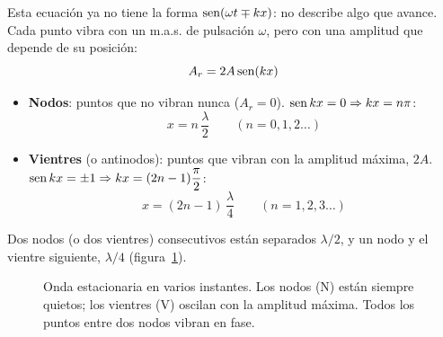Esta ecuación ya no tiene la forma \(\operatorname{sen}(\omega t \mp kx)\): no describe algo que avance. Cada punto vibra con un m.a.s. de
pulsación \(\omega\), pero con una amplitud que depende de su posición:
\begin{equation*}
    A_r = 2A\operatorname{sen}(kx)
\end{equation*}

\begin{itemize}
    \item \textbf{Nodos}: puntos que no vibran nunca (\(A_r = 0\)). \(\operatorname{sen} kx = 0 \Rightarrow kx = n\pi\):
    \[ \boxed{x = n\,\dfrac{\lambda}{2}} \qquad (n = 0, 1, 2\ldots) \]
    \item \textbf{Vientres} (o antinodos): puntos que vibran con la amplitud máxima, \(2A\). \(\operatorname{sen} kx = \pm 1 \Rightarrow
    kx = (2n - 1)\dfrac{\pi}{2}\):
    \[ \boxed{x = (2n - 1)\,\dfrac{\lambda}{4}} \qquad (n = 1, 2, 3\ldots) \]
\end{itemize}
Dos nodos (o dos vientres) consecutivos están separados \(\lambda/2\), y un nodo y el vientre siguiente, \(\lambda/4\)
(figura~\ref{fig:ond-estacionaria}).

\begin{figure}[H]
    \centering
    \caption{Onda estacionaria en varios instantes. Los nodos (N) están siempre quietos; los vientres (V) oscilan con la
    amplitud máxima. Todos los puntos entre dos nodos vibran en fase.}
    \label{fig:ond-estacionaria}
\end{figure}

